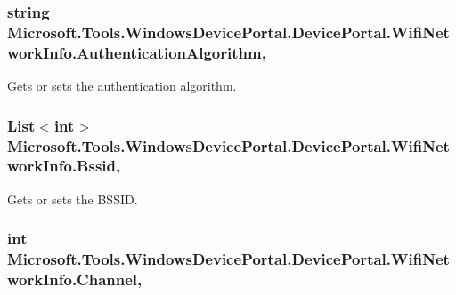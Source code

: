 \subsubsection[{\texorpdfstring{Authentication\+Algorithm}{AuthenticationAlgorithm}}]{\setlength{\rightskip}{0pt plus 5cm}string Microsoft.\+Tools.\+Windows\+Device\+Portal.\+Device\+Portal.\+Wifi\+Network\+Info.\+Authentication\+Algorithm\hspace{0.3cm}{\ttfamily [get]}, {\ttfamily [set]}}\hypertarget{class_microsoft_1_1_tools_1_1_windows_device_portal_1_1_device_portal_1_1_wifi_network_info_a66374e9ecd5fcb5dfcdf2f3592aec63b}{}\label{class_microsoft_1_1_tools_1_1_windows_device_portal_1_1_device_portal_1_1_wifi_network_info_a66374e9ecd5fcb5dfcdf2f3592aec63b}


Gets or sets the authentication algorithm. 

\subsubsection[{\texorpdfstring{Bssid}{Bssid}}]{\setlength{\rightskip}{0pt plus 5cm}List$<$int$>$ Microsoft.\+Tools.\+Windows\+Device\+Portal.\+Device\+Portal.\+Wifi\+Network\+Info.\+Bssid\hspace{0.3cm}{\ttfamily [get]}, {\ttfamily [set]}}\hypertarget{class_microsoft_1_1_tools_1_1_windows_device_portal_1_1_device_portal_1_1_wifi_network_info_a0939a5e1fc509900a0669270c4e84d55}{}\label{class_microsoft_1_1_tools_1_1_windows_device_portal_1_1_device_portal_1_1_wifi_network_info_a0939a5e1fc509900a0669270c4e84d55}


Gets or sets the B\+S\+S\+ID. 

\subsubsection[{\texorpdfstring{Channel}{Channel}}]{\setlength{\rightskip}{0pt plus 5cm}int Microsoft.\+Tools.\+Windows\+Device\+Portal.\+Device\+Portal.\+Wifi\+Network\+Info.\+Channel\hspace{0.3cm}{\ttfamily [get]}, {\ttfamily [set]}}\hypertarget{class_microsoft_1_1_tools_1_1_windows_device_portal_1_1_device_portal_1_1_wifi_network_info_a84165c7dee59b2eebeed08673f0710e1}{}\label{class_microsoft_1_1_tools_1_1_windows_device_portal_1_1_device_portal_1_1_wifi_network_info_a84165c7dee59b2eebeed08673f0710e1}


